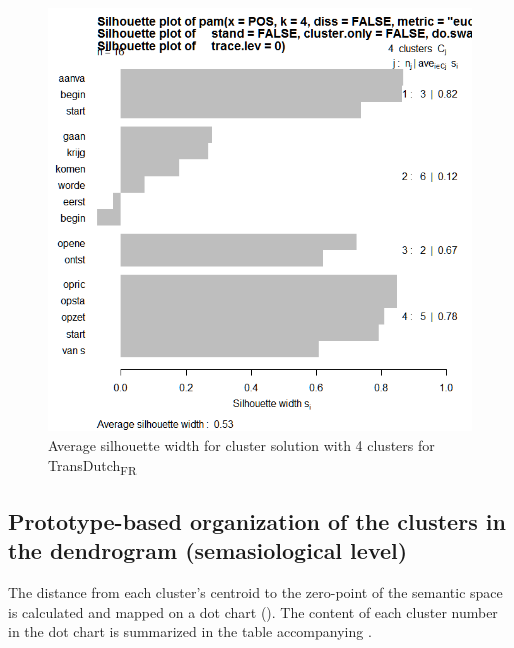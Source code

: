 \begin{figure}
\includegraphics[height=.4\textheight]{figures/Vandevoorde2-img80.png}
\caption{\label{fig:4:77}Average silhouette width for cluster solution with 4 clusters for TransDutch\textsubscript{FR}}
\end{figure}

\subsection{Prototype-based organization of the clusters in the dendrogram (semasiological level)}
\label{sec:4.4.2}  
The distance from each cluster’s centroid to the zero-point of the semantic space is calculated and mapped on a dot chart (). The content of each cluster number in the dot chart is summarized in the table accompanying .

